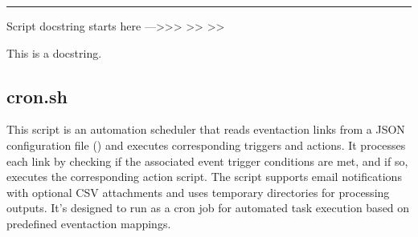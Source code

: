 \documentclass[letterpaper,10pt,english]{sphinxmanual}
\begin{document}
\bigskip\hrule\bigskip


\sphinxAtStartPar
Script docstring starts here —\textgreater{}\textgreater{}\textgreater{}
\textendash{}\textgreater{}\textgreater{}
\textendash{}\textgreater{}\textgreater{}

\sphinxAtStartPar
This is a docstring.

\sphinxstepscope


\subsection{cron.sh}
\label{\detokenize{Architecture/scripts/cron:cron-sh}}\label{\detokenize{Architecture/scripts/cron::doc}}
\sphinxAtStartPar
This script is an automation scheduler that reads event\sphinxhyphen{}action links from a JSON configuration file () and executes corresponding triggers and actions. It processes each link by checking if the associated event trigger conditions are met, and if so, executes the corresponding action script. The script supports email notifications with optional CSV attachments and uses temporary directories for processing outputs. It’s designed to run as a cron job for automated task execution based on predefined event\sphinxhyphen{}action mappings.

\sphinxAtStartPar
{}


\sphinxAtStartPar
{}

\end{document}
